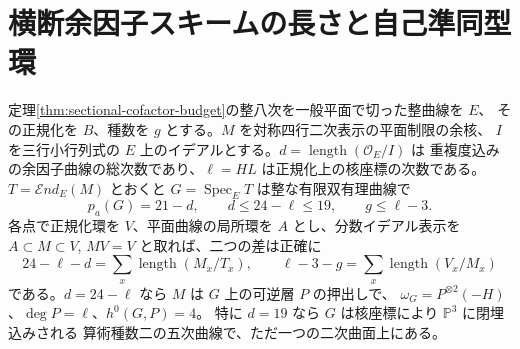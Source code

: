 \section{横断余因子スキームの長さと自己準同型環}
\label{sec:sectional-cofactor-length}
\begin{theorem}\label{thm:sectional-cofactor-length}
定理\ref{thm:sectional-cofactor-budget}の整八次を一般平面で切った整曲線を $E$、
その正規化を $B$、種数を $g$ とする。$M$ を対称四行二次表示の平面制限の余核、
$I$ を三行小行列式の $E$ 上のイデアルとする。$d=\operatorname{length}(\mathcal O_E/I)$ は
重複度込みの余因子曲線の総次数であり、$\ell=HL$ は正規化上の核座標の次数である。
$T=\mathcal End_E(M)$ とおくと $G=\operatorname{Spec}_E T$ は整な有限双有理曲線で
\[
  p_a(G)=21-d,\qquad d\le24-\ell\le19,\qquad g\le\ell-3.
\]
各点で正規化環を $V$、平面曲線の局所環を $A$ とし、分数イデアル表示を
$A\subset M\subset V$, $MV=V$ と取れば、二つの差は正確に
\[
  24-\ell-d=\sum_x\operatorname{length}(M_x/T_x),\qquad
  \ell-3-g=\sum_x\operatorname{length}(V_x/M_x)
\]
である。$d=24-\ell$ なら $M$ は $G$ 上の可逆層 $P$ の押出しで、
$\omega_G=P^{\otimes2}(-H)$、$\deg P=\ell$、$h^0(G,P)=4$。
特に $d=19$ なら $G$ は核座標により $\mathbb P^3$ に閉埋込みされる
算術種数二の五次曲線で、ただ一つの二次曲面上にある。
\end{theorem}
